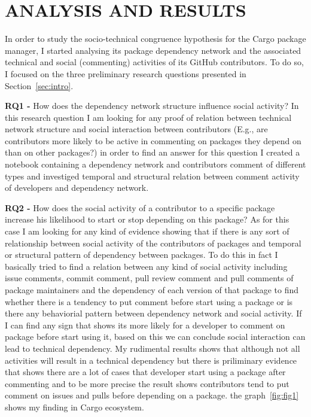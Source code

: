 \section{ANALYSIS AND RESULTS}

In order to study the socio-technical congruence hypothesis for the Cargo package manager, I started analysing its package dependency network and the associated technical and social (commenting) activities of its GitHub contributors.
To do so, I focused on the three preliminary research questions presented in Section~\ref{sec:intro}.


\textbf{RQ1 - } How does the dependency network structure influence social activity? In this research question I am looking for any proof of relation between technical network structure and social interaction between contributors (E.g., are contributors more likely to be active in commenting on packages they depend on than on other packages?) in order to find an answer for this question I created a notebook containing a dependency network and contributors comment of different types and investiged temporal and structural relation between comment activity of developers and dependency network. 

\textbf{RQ2 - } How does the social activity of a contributor to a specific package increase his likelihood to start or stop depending on this package? As for this case I am looking for any kind of evidence showing that if there is any sort of relationship between social activity of the contributors of packages and temporal or structural pattern of dependency between packages. To do this in fact I basically tried to find a relation between any kind of social activity including issue comments, commit comment, pull review comment and pull comments of package maintainers and the dependency of each version of that package to find whether there is a tendency to put comment before start using a package or is there any behaviorial pattern between dependency network and social activity. If I can find any sign that shows its more likely for a developer to comment on package before start using it, based on this we can conclude social interaction can lead to technical dependency. My rudimental results shows that although not all activities will result in a technical dependency but there is priliminary evidence that shows there are a lot of cases that developer start using a package after commenting and to be more precise the result shows contributors tend to put comment on issues and pulls before depending on a package. the graph~\ref{fig:fig1} shows my finding in Cargo ecosystem.

